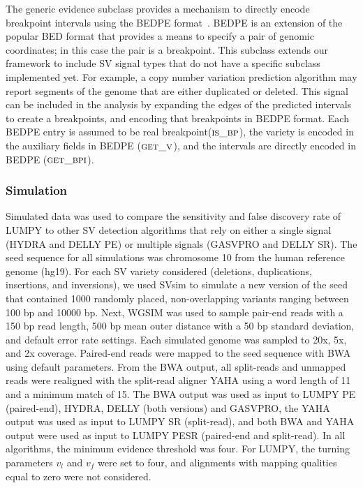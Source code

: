 \documentclass[10pt]{bmc_article}
\newenvironment{bmcformat}{\begin{raggedright}\baselineskip20pt\sloppy\setboolean{publ}{false}}{\end{raggedright}\baselineskip20pt\sloppy}
\begin{document}
\begin{bmcformat}
The generic evidence subclass provides a mechanism to directly encode breakpoint
intervals using the BEDPE format~\cite{quinlan2010a}.  BEDPE is an extension of
the popular BED format that provides a means to specify a pair of genomic
coordinates; in this case the pair is a breakpoint.  This subclass extends our
framework to include SV signal types that do not have a specific subclass
implemented yet.  For example, a copy number variation prediction algorithm may
report segments of the genome that are either duplicated or deleted.  This
signal can be included in the analysis by expanding the edges of the predicted
intervals to create a breakpoints, and encoding that breakpoints in BEDPE
format.
Each BEDPE entry is assumed to be real breakpoint($\textsc{is\_bp}$), the
variety is encoded in the auxiliary fields in BEDPE ($\textsc{get\_v}$), and the
intervals are directly encoded in BEDPE ($\textsc{get\_bpi}$).


\subsubsection*{Simulation}

Simulated data was used to compare the sensitivity and false discovery rate of
LUMPY to other SV detection algorithms that rely on either a single signal
(HYDRA and DELLY PE) or multiple signals (GASVPRO and DELLY SR).  The seed
sequence for all simulations was chromosome 10 from the human reference genome
(hg19).  For each SV variety considered (deletions, duplications, insertions,
and inversions), we used SVsim to simulate a new version of the seed that
contained 1000 randomly placed, non-overlapping variants ranging between 100 bp
and 10000 bp. Next, WGSIM was used to sample pair-end reads with a 150 bp
read length, 500 bp mean outer distance with a 50 bp standard deviation, and
default error rate settings.  Each simulated genome was sampled to 20x, 5x, and
2x coverage. Paired-end reads were mapped to the seed sequence with BWA using
default parameters.  From the BWA output, all split-reads and unmapped reads
were realigned with the split-read aligner YAHA using a word length of 11 and a
minimum match of 15. The BWA output was used as input to LUMPY PE
(paired-end), HYDRA, DELLY (both versions) and GASVPRO, the YAHA output was used
as input to LUMPY SR (split-read), and both BWA and YAHA output were used as
input to LUMPY PESR (paired-end and split-read).  In all algorithms, the
minimum evidence threshold was four.  For LUMPY, the turning parameters $v_l$
and $v_f$ were set to four, and alignments with mapping qualities equal to zero
were not considered.


\end{bmcformat}
\end{document}
